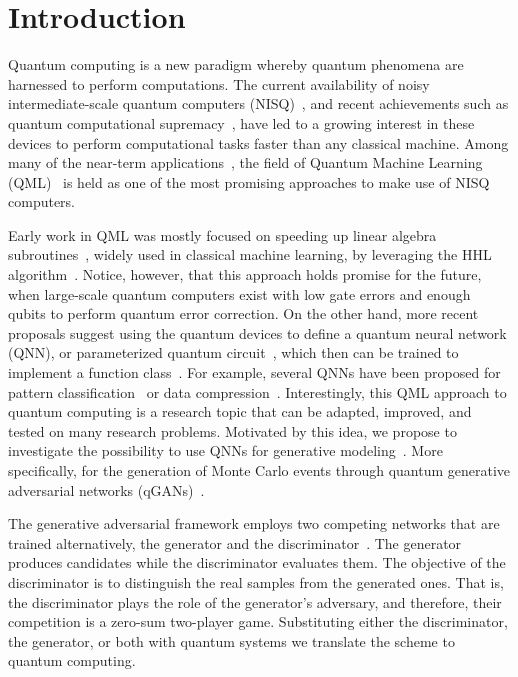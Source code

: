 \documentclass[twocolumn,preprintnumbers,superscriptaddress]{revtex4-2}
\begin{document}
\section{Introduction}

Quantum computing is a new paradigm whereby quantum phenomena are harnessed to
perform computations. The current availability of noisy intermediate-scale
quantum computers (NISQ)~\cite{nisq}, and recent achievements such as quantum
computational supremacy~\cite{supremacy, zhong2020quantum}, have led to a
growing interest in these devices to perform computational tasks faster than any
classical machine. Among many of the near-term
applications~\cite{cerezo2021variational, bharti2021noisy}, the field of Quantum
Machine Learning (QML)~\cite{biamonte2017quantum, schuld2018supervised} is held
as one of the most promising approaches to make use of NISQ computers.

Early work in QML was mostly focused on speeding up linear algebra
subroutines~\cite{wiebe2012quantum, lloyd:2013ml, Rebentrost:2014svm,
  kerenidis2020quantum}, widely used in classical machine learning, by leveraging
the HHL algorithm~\cite{harrow2009quantum}. Notice, however, that this approach holds
promise for the future, when large-scale quantum computers exist with low gate
errors and enough qubits to perform quantum error correction. On the other hand, more
recent proposals suggest using the quantum devices to define a quantum neural network (QNN), or parameterized
quantum circuit~\cite{benedetti2019parameterized, sim2019expressibility,
  bravo2020scaling}, which then can be trained to
implement a function class~\cite{schuld2021effect, goto2021universal,
  perez2021one}. For example, several QNNs have been proposed for pattern
classification~\cite{havlivcek2019supervised, Schuld:2020circuit,
  perezsalinas:2020reuploading, dutta2021realization} or data compression~\cite{romero2017quantum,
  bravo2021quantum, cao2021noise}. Interestingly, this QML approach to quantum
computing is a research topic that can be adapted, improved, and tested on many
research problems. Motivated by this idea, we propose to investigate the
possibility to use QNNs for generative modeling~\cite{benedetti2019generative,
  hamilton2019generative, coyle2020born}. More specifically, for the generation of
Monte Carlo events through quantum generative adversarial networks
(qGANs)~\cite{dallaire2018quantum, lloyd2018quantum}.

The generative adversarial framework employs two competing networks that are
trained alternatively, the generator and the
discriminator~\cite{goodfellow2014generative}. The generator produces candidates
while the discriminator evaluates them. The objective of the discriminator is to
distinguish the real samples from the generated ones. That is, the discriminator
plays the role of the generator's adversary, and therefore, their competition is
a zero-sum two-player game. Substituting either the discriminator, the
generator, or both with quantum systems we translate the scheme to quantum
computing.
\end{document}
